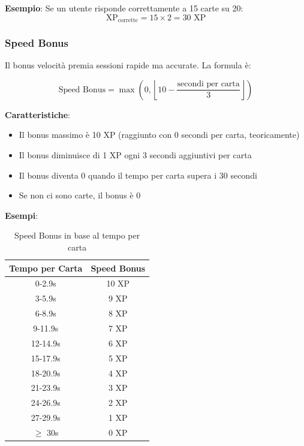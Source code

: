 \documentclass[11pt,a4paper]{article}
\begin{document}
\textbf{Esempio}: Se un utente risponde correttamente a 15 carte su 20:
\begin{equation}
\text{XP}_{\text{corrette}} = 15 \times 2 = 30 \text{ XP}
\end{equation}

\subsubsection{Speed Bonus}

Il bonus velocità premia sessioni rapide ma accurate. La formula è:

\begin{equation}
\text{Speed Bonus} = \max\left(0, \left\lfloor 10 - \frac{\text{secondi per carta}}{3} \right\rfloor\right)
\end{equation}

\textbf{Caratteristiche}:
\begin{itemize}
    \item Il bonus massimo è 10 XP (raggiunto con 0 secondi per carta, teoricamente)
    \item Il bonus diminuisce di 1 XP ogni 3 secondi aggiuntivi per carta
    \item Il bonus diventa 0 quando il tempo per carta supera i 30 secondi
    \item Se non ci sono carte, il bonus è 0
\end{itemize}

\textbf{Esempi}:
\begin{table}[H]
\centering
\begin{tabular}{@{}cc@{}}
\toprule
\textbf{Tempo per Carta} & \textbf{Speed Bonus} \\
\midrule
0-2.9s & 10 XP \\
3-5.9s & 9 XP \\
6-8.9s & 8 XP \\
9-11.9s & 7 XP \\
12-14.9s & 6 XP \\
15-17.9s & 5 XP \\
18-20.9s & 4 XP \\
21-23.9s & 3 XP \\
24-26.9s & 2 XP \\
27-29.9s & 1 XP \\
$\geq$ 30s & 0 XP \\
\bottomrule
\end{tabular}
\caption{Speed Bonus in base al tempo per carta}
\end{table}
\end{document}
